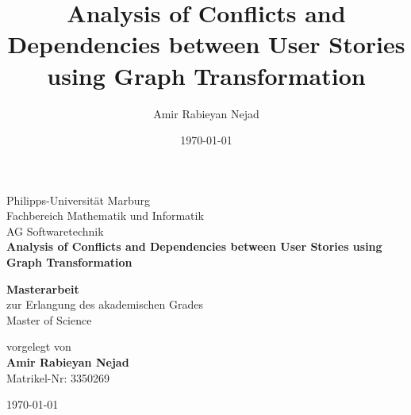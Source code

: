 \documentclass[11pt,a4paper]{article}
\title{Analysis of Conflicts and Dependencies between User Stories using Graph Transformation}
\author{Amir Rabieyan Nejad}
\date{\today}
\numberwithin{equation}{section}
\begin{document}
\begin{titlepage}
    \begin{center}
        \vspace*{1cm}
        \Large
        Philipps-Universität Marburg\\
        Fachbereich Mathematik und Informatik\\
        AG Softwaretechnik \\
        \vspace*{1cm}
        \Large
        \textbf{Analysis of Conflicts and Dependencies between User Stories using Graph Transformation}
            
      
        \vspace{1.5cm}
            
        \textbf{Masterarbeit}\\
        zur Erlangung des akademischen Grades \\
        Master of Science
        
        \vspace{1.5cm}
        vorgelegt von\\
        \textbf{Amir Rabieyan Nejad}\\
        Matrikel-Nr: 3350269
            
    
            
        \vspace{1.5cm}
            
        
            
        
        
        \today\\
        
    \end{center}
\end{titlepage}
\pagestyle{empty}
\newpage\null\newpage

\newpage\null\newpage


\newpage
\pagestyle{plain}
\tableofcontents
\newpage\null\newpage










\newpage



   
\end{document}
